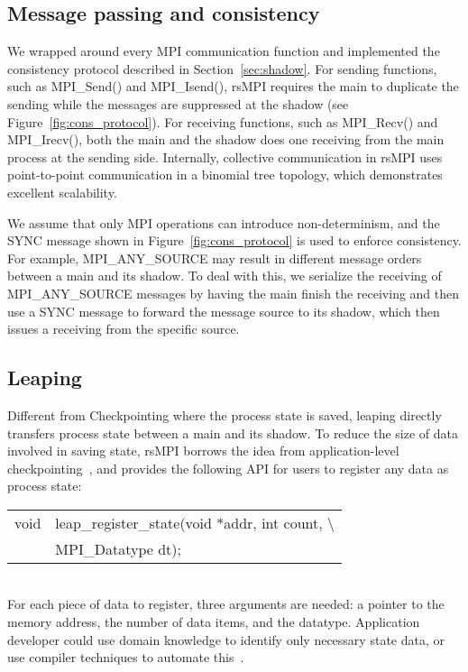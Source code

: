 \subsection{Message passing and consistency}
We wrapped around every MPI communication function and implemented the consistency protocol described in Section~\ref{sec:shadow}. For sending functions, such as MPI\_Send() and MPI\_Isend(), rsMPI requires the main to duplicate the sending while the messages are suppressed at the shadow (see Figure~\ref{fig:cons_protocol}). For receiving functions, such as MPI\_Recv() and MPI\_Irecv(), both the main and the shadow does one receiving from the main process at the sending side. Internally, collective communication in rsMPI uses point-to-point communication in a binomial tree topology, which demonstrates excellent scalability.

We assume that only MPI operations can introduce non-determinism, and the SYNC message shown in Figure~\ref{fig:cons_protocol} is used to enforce consistency. For example, MPI\_ANY\_SOURCE may result in different message orders between a main and its shadow. To deal with this, we serialize the receiving of MPI\_ANY\_SOURCE messages by having the main finish the receiving and then use a SYNC message to forward the message source to its shadow, which then issues a receiving from the specific source. 


\subsection{Leaping}
Different from Checkpointing where the process state is saved, leaping directly transfers process state between a main and its shadow. 
To reduce the size of data involved in saving state, rsMPI borrows the idea from application-level checkpointing~\cite{Beguelin97applicationlevel}, and provides the following API for users to register any data as process state:

\begin{tabular}{ l l}
void & leap\_register\_state(void *addr, int count, \textbackslash \\
& MPI\_Datatype dt);
\end{tabular} \\
For each piece of data to register, three arguments are needed: a pointer to the memory address, the number of data items, and the datatype. 
Application developer could use domain knowledge to identify only necessary state data, or use compiler techniques to automate this~\cite{5160999}. 


